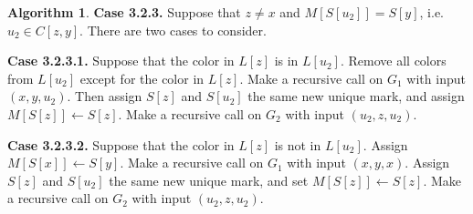 \documentclass[12pt,letterpaper]{article}
\theoremstyle{plain}
\theoremstyle{definition}
\theoremstyle{break}
\newtheorem{algorithm}[lemma]{Algorithm}     %
\begin{document}
\begin{algorithm}
\textbf{Case 3.2.3.} Suppose that $z\ne x$ and $M[S[u_2]]=S[y]$, i.e.
$u_2\in C[z,y]$. There are
two cases to consider.

\textbf{Case 3.2.3.1.} Suppose that the color in $L[z]$ is in $L[u_2]$. Remove
all colors from $L[u_2]$ except for the color in $L[z]$.
Make a recursive call on $G_1$ with input $(x, y, u_2)$.
Then assign $S[z]$ and $S[u_2]$ the same new unique mark, and assign
$M[S[z]]\leftarrow S[z]$. Make a
recursive call on $G_2$ with input $(u_2, z, u_2)$.

\textbf{Case 3.2.3.2.} Suppose that the color in $L[z]$ is not in $L[u_2]$.
Assign $M[S[x]]\leftarrow S[y]$. Make a recursive call on $G_1$
with input $(x, y, x)$.
Assign $S[z]$ and $S[u_2]$ the same new unique mark, and
set $M[S[z]]\leftarrow S[z]$. Make a
recursive call on $G_2$ with input $(u_2, z, u_2)$.
\end{algorithm}
\end{document}

